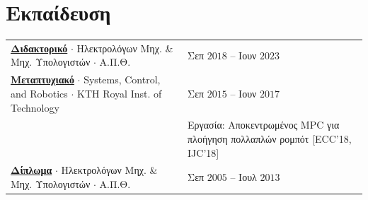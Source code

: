 \documentclass[a4paper,10pt,twoside]{article}
\begin{document}
\section{\textbf{Εκπαίδευση}}%
\begin{center}
\begin{tabular}{ll}
  \href{https://www.didaktorika.gr/eadd/handle/10442/56399?locale=el}{\textbf{Διδακτορικό}} $\cdot$ Ηλεκτρολόγων Μηχ. \& Μηχ. Υπολογιστών $\cdot$ Α.Π.Θ. & {\small \textcolor{agray}{Σεπ $2018$ -- Ιουν $2023$}} \\
  \href{http://kth.diva-portal.org/smash/record.jsf?pid=diva2\%3A1102597\&dswid=2875}{\textbf{Μεταπτυχιακό}} $\cdot$ Systems, Control, and Robotics $\cdot$ KTH Royal Inst. of Technology & {\small \textcolor{agray}{Σεπ $2015$ -- Ιουν $2017$}} \\
  & \hspace{-30.3em} Εργασία: Αποκεντρωμένος MPC για πλοήγηση πολλαπλών ρομπότ [ECC'18, IJC'18] \\
  \href{https://ikee.lib.auth.gr/record/291560}{\textbf{Δίπλωμα}} $\cdot$ Ηλεκτρολόγων Μηχ. \& Μηχ. Υπολογιστών $\cdot$ Α.Π.Θ. & {\small \textcolor{agray}{Σεπ $2005$ -- Ιουλ $2013$}}
\end{tabular}
\end{center}
\end{document}
